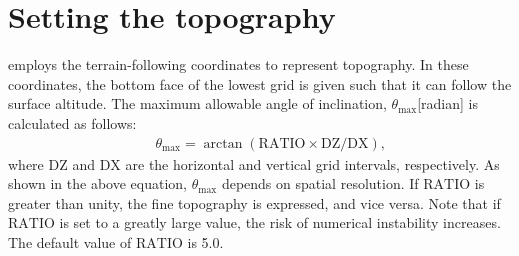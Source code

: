\section{Setting the topography} \label{subsec:basic_usel_topo}

\scalerm employs the terrain-following coordinates to represent topography.
In these coordinates, the bottom face of the lowest grid is given such that it can follow the surface altitude. The maximum allowable angle of inclination, $\theta_{\max}$[radian] is calculated as follows:
\begin{eqnarray}
  && \theta_{\max} = \arctan( \mathrm{RATIO} \times \mathrm{DZ}/\mathrm{DX} )\nonumber,
\end{eqnarray}
where $\mathrm{DZ}$ and $\mathrm{DX}$ are the horizontal and vertical grid intervals, respectively.
As shown in the above equation, $\theta_{\max}$ depends on spatial resolution.
If $\mathrm{RATIO}$ is greater than unity, the fine topography is expressed, and vice versa.
Note that if $\mathrm{RATIO}$ is set to a greatly large value, the risk of numerical instability increases.
The default value of $\mathrm{RATIO}$ is 5.0.


